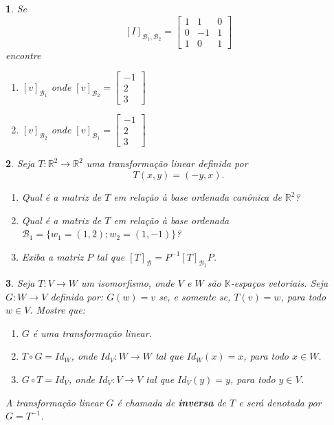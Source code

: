 \documentclass[12pt]{exam}
\newtheorem{exercicio}{}
\newcommand{\real}{\mathbb{R}}
\newcommand{\cp}[1]{\mathbb{#1}}
\begin{document}
\begin{exercicio}
  Se
  \[
    [I]_{\mathcal{B}_1,\mathcal{B}_2} = \begin{bmatrix}
      1 & 1 & 0\\
      0 & -1 & 1\\
      1 & 0 & 1
    \end{bmatrix}
  \]
  encontre
  \begin{enumerate}[label=({\alph*})]
    \item $[v]_{\mathcal{B}_1}$ onde $[v]_{\mathcal{B}_2} = \begin{bmatrix}
      -1\\2\\3
    \end{bmatrix}$
    \item $[v]_{\mathcal{B}_2}$ onde $[v]_{\mathcal{B}_1} = \begin{bmatrix}
      -1\\2\\3
    \end{bmatrix}$
  \end{enumerate}
\end{exercicio}

\begin{exercicio}
  Seja $T : \real^2 \to \real^2$ uma transforma\c{c}\~ao linear definida por
  \[
    T(x,y) = (-y,x).
  \]
  \begin{enumerate}[label=({\alph*})]
    \item Qual \'e a matriz de $T$ em rela\c{c}\~ao \`a base ordenada can\^onica de $\real^2$?
    \item Qual \'e a matriz de $T$ em rela\c{c}\~ao \`a base ordenada $\mathcal{B}_1 = \{w_1 = (1,2); w_2 = (1,-1)\}$?
    \item Exiba a matriz $P$ tal que $[T]_{\mathcal{B}} = P^{-1}[T]_{\mathcal{B}_1}P$.
  \end{enumerate}
\end{exercicio}

\begin{exercicio}
  Seja $T : V \to W$ um isomorfismo, onde $V$ e $W$ s\~ao $\cp{K}$-espa\c{c}os vetoriais. Seja $G : W \to V$ definida por: $G(w) = v$ se, e somente se, $T(v) = w$, para todo $w \in V$. Mostre que:
  \begin{enumerate}[label=({\alph*})]
    \item $G$ \'e uma transforma\c{c}\~ao linear.
    \item $T\circ G = Id_W$, onde $Id_V : W \to W$ tal que $Id_W(x) = x$, para todo $x \in W$.
    \item $G\circ T = Id_V$, onde $Id_V : V \to V$ tal que $Id_V(y) = y$, para todo $y \in V$.
  \end{enumerate}
  A transforma\c{c}\~ao linear $G$ \'e chamada de \textbf{inversa} de $T$ e ser\'a denotada por $G = T^{-1}$.
\end{exercicio}
\end{document}
